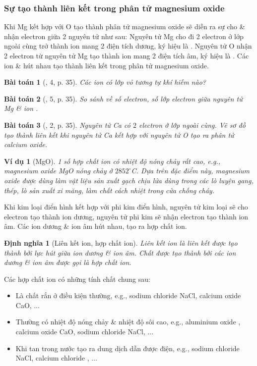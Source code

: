 \documentclass{article}
\newtheorem{baitoan}{Bài toán}
\newtheorem{dinhnghia}{Định nghĩa}
\newtheorem{vidu}{Ví dụ}
\begin{document}
\subsubsection{Sự tạo thành liên kết trong phân tử magnesium oxide}
Khi Mg kết hợp với O tạo thành phân tử magnesium oxide sẽ diễn ra sự cho \& nhận electron giữa 2 nguyên tử như sau: Nguyên tử Mg cho đi 2 electron ở lớp ngoài cùng trở thành ion mang 2 điện tích dương, ký hiệu là . Nguyên tử O nhận 2 electron từ nguyên tử Mg tạo thành ion mang 2 điện tích âm, ký hiệu là . Các ion  \&  hút nhau tạo thành liên kết trong phân tử magnesium oxide.

\begin{baitoan}[\cite{SGK_KHTN_7_Canh_Dieu}, 4, p. 35]
	Các ion \emph{} có lớp vỏ tương tự khí hiếm nào?
\end{baitoan}

\begin{baitoan}[\cite{SGK_KHTN_7_Canh_Dieu}, 5, p. 35]
	So sánh về số electron, số lớp electron giữa nguyên tử \emph{Mg} \& ion \emph{}.
\end{baitoan}

\begin{baitoan}[\cite{SGK_KHTN_7_Canh_Dieu}, 2, p. 35]
	Nguyên tử \emph{Ca} có $2$ electron ở lớp ngoài cùng. Vẽ sơ đồ tạo thành liên kết khi nguyên tử \emph{Ca} kết hợp với nguyên tử \emph{O} tạo ra phân tử calcium oxide.
\end{baitoan}

\begin{vidu}[MgO]
	1 số hợp chất ion có nhiệt độ nóng chảy rất cao, e.g., magnesium oxide \emph{MgO} nóng chảy ở $2852^\circ$C. Dựa trên đặc điểm này, magnesium oxide được dùng làm vật liệu sản xuất gạch chịu lửa dùng trong các lò luyện gang, thép, lò sản xuất xi măng, làm chất cách nhiệt trong cửa chống cháy.
\end{vidu}
Khi kim loại điển hình kết hợp với phi kim điển hình, nguyên tử kim loại sẽ cho electron tạo thành ion dương, nguyên tử phi kim sẽ nhận electron tạo thành ion âm. Các ion dương \& ion âm hút nhau, tạo ra hợp chất ion.

\begin{dinhnghia}[Liên kết ion, hợp chất ion]
	\emph{Liên kết ion} là liên kết được tạo thành bởi lực hút giữa ion dương \& ion âm. Chất được tạo thành bởi các ion dương \& ion âm được gọi là \emph{hợp chất ion}.
\end{dinhnghia}
Các hợp chất ion có những tính chất chung sau:
\begin{itemize}
	\item Là chất rắn ở điều kiện thường, e.g., sodium chloride NaCl, calcium oxide CaO, $\ldots$
	\item Thường có nhiệt độ nóng chảy \& nhiệt độ sôi cao, e.g., aluminium oxide , calcium oxide CaO, sodium chloride NaCl, $\ldots$
	\item Khi tan trong nước tạo ra dung dịch dẫn được điện, e.g., sodium chloride NaCl, calcium chloride , $\ldots$
\end{itemize}
\end{document}
